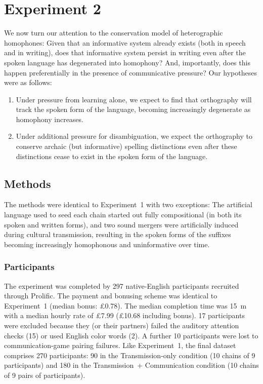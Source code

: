 \documentclass[doc,biblatex]{apa7}
\begin{document}

\section{Experiment 2}

We now turn our attention to the conservation model of heterographic homophones: Given that an informative system already exists (both in speech and in writing), does that informative system persist in writing even after the spoken language has degenerated into homophony? And, importantly, does this happen preferentially in the presence of communicative pressure? Our hypotheses were as follows:
\begin{enumerate}
	\item Under pressure from learning alone, we expect to find that orthography will track the spoken form of the language, becoming increasingly degenerate as homophony increases.
	\item Under additional pressure for disambiguation, we expect the orthography to conserve archaic (but informative) spelling distinctions even after these distinctions cease to exist in the spoken form of the language.
\end{enumerate}

\subsection{Methods}

The methods were identical to Experiment~1 with two exceptions: The artificial language used to seed each chain started out fully compositional (in both its spoken and written forms), and two sound mergers were artificially induced during cultural transmission, resulting in the spoken forms of the suffixes becoming increasingly homophonous and uninformative over time.

\subsubsection{Participants}

The experiment was completed by 297 native-English participants recruited through Prolific. The payment and bonusing scheme was identical to Experiment~1 (median bonus: £0.78). The median completion time was 15~m with a median hourly rate of £7.99 (£10.68 including bonus). 17 participants were excluded because they (or their partners) failed the auditory attention checks (15) or used English color words (2). A further 10 participants were lost to communication-game pairing failures. Like Experiment~1, the final dataset comprises 270 participants: 90 in the Transmission-only condition (10 chains of 9 participants) and 180 in the Transmission~+ Communication condition (10 chains of 9 pairs of participants).
\end{document}
